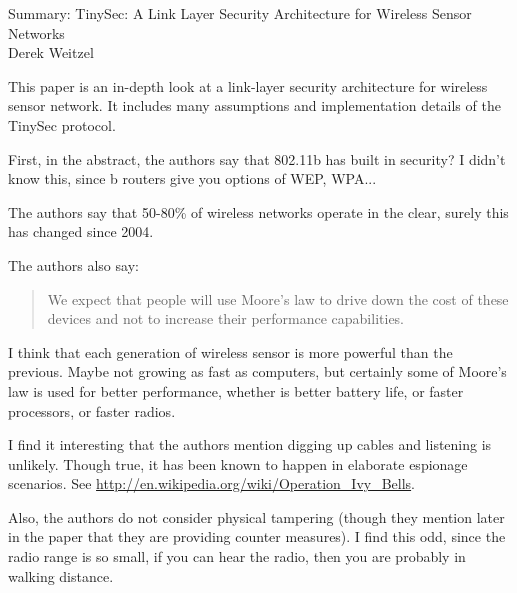 \documentclass[12pt]{article}
\begin{document}
\begin{center}
{\huge Summary: TinySec: A Link Layer Security Architecture for Wireless Sensor Networks } \\
Derek Weitzel
\end{center}

This paper is an in-depth look at a link-layer security architecture for wireless sensor network.  It includes many assumptions and implementation details of the TinySec protocol.

First, in the abstract, the authors say that 802.11b has built in security?  I didn't know this, since b routers give you options of WEP, WPA...

The authors say that 50-80\% of wireless networks operate in the clear, surely this has changed since 2004.  

The authors also say:
\begin{quote}
We expect that people will use Moore's law to drive down the cost of these devices and not to increase their performance capabilities.
\end{quote}
I think that each generation of wireless sensor is more powerful than the previous.  Maybe not growing as fast as computers, but certainly some of Moore's law is used for better performance, whether is better battery life, or faster processors, or faster radios.

I find it interesting that the authors mention digging up cables and listening is unlikely.  Though true, it has been known to happen in elaborate espionage scenarios.  See \url{http://en.wikipedia.org/wiki/Operation_Ivy_Bells}.

Also, the authors do not consider physical tampering (though they mention later in the paper that they are providing counter measures).  I find this odd, since the radio range is so small, if you can hear the radio, then you are probably in walking distance.
\end{document}
